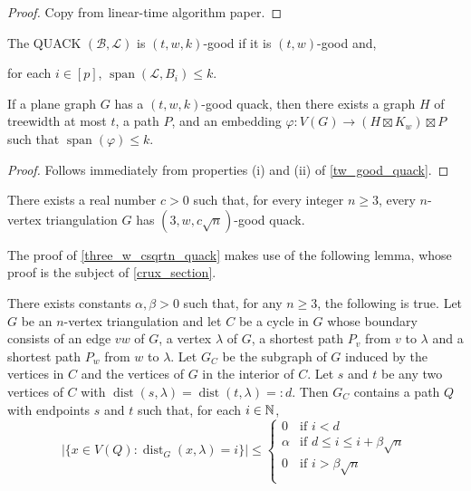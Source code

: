 \documentclass{patmorin}
\newcommand{\defin}[1]{\emph{\textcolor{brightmaroon}{#1}}}
\DeclareMathOperator{\spn}{span}
\DeclareMathOperator{\dist}{dist}
\begin{document}
\begin{proof}
  Copy from linear-time algorithm paper.
\end{proof}

The QUACK $(\mathcal{B},\mathcal{L})$ is $(t,w,k)$-good if it is $(t,w)$-good and,
\begin{compactenum}[({good-}a)]\setcounter{enumi}{3}
  \item for each $i\in[p]$, $\spn(\mathcal{L},B_i)\le k$.
\end{compactenum}

\begin{lem}
  If a plane graph $G$ has a $(t,w,k)$-good quack, then there exists a graph $H$ of treewidth at most $t$, a path $P$, and an embedding $\varphi:V(G)\to (H\boxtimes K_w)\boxtimes P$ such that $\spn(\varphi)\le k$.
\end{lem}

\begin{proof}
  Follows immediately from properties (i) and (ii) of \cref{tw_good_quack}.
\end{proof}






\begin{thm}\label{three_w_csqrtn_quack}
  There exists a real number $c>0$ such that, for every integer $n\ge 3$, every $n$-vertex triangulation $G$ has $(3,w,c\sqrt{n})$-good quack.
\end{thm}


The proof of \cref{three_w_csqrtn_quack} makes use of the following lemma, whose proof is the subject of \cref{crux_section}.

\begin{lem}\label{awesome_path}
  There exists constants $\alpha,\beta>0$ such that, for any $n\ge 3$, the following is true.
  Let $G$ be an $n$-vertex triangulation and let $C$ be a cycle in $G$ whose boundary consists of an edge $vw$ of $G$, a vertex $\lambda$ of $G$, a shortest path $P_v$ from $v$ to $\lambda$ and a shortest path $P_w$ from $w$ to $\lambda$.  Let $G_C$ be the subgraph of $G$ induced by the vertices in $C$ and the vertices of $G$ in the interior of $C$.  Let $s$ and $t$ be any two vertices of $C$ with $\dist(s,\lambda)=\dist(t,\lambda)=:d$.  Then $G_C$ contains a path $Q$ with endpoints $s$ and $t$ such that, for each $i\in\mathbb{N}$,
    \[  |\{x\in V(Q):\dist_G(x,\lambda)=i\}| \le
      \begin{cases}
        0 & \text{if $i < d$} \\
        \alpha & \text{if $d\le i \le i+\beta\sqrt{n}$} \\
        0 & \text{if $i > \beta\sqrt{n}$} \\
      \end{cases}
    \]
\end{lem}
\end{document}
